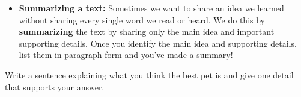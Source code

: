 \documentclass[12pt]{article}
\begin{document}
\vspace{1em}

\begin{tcolorbox}[colframe=black!40, colback=gray!5, 
coltitle=black, colbacktitle=black!20, fonttitle=\bfseries\Large, 
title=Additional Notes, halign title=center, left=5pt, right=5pt, top=5pt, bottom=15pt]

\begin{itemize}
    \item \textbf{Summarizing a text:} Sometimes we want to share an idea we learned without sharing every single word we read or heard. We do this by \textbf{summarizing} the text by sharing only the main idea and important supporting details. Once you identify the main idea and supporting details, list them in paragraph form and you've made a summary!
\end{itemize}
\end{tcolorbox}

\vspace{1em}

\begin{tcolorbox}[colframe=black!60, colback=white, 
coltitle=black, colbacktitle=black!15, fonttitle=\bfseries\Large, 
title=Exit Ticket, halign title=center, left=10pt, right=10pt, top=10pt, bottom=15pt]

Write a sentence explaining what you think the best pet is and give one detail that supports your answer.

\vspace{2cm} 
\underline{\hspace{15cm}} \\[0.8cm]
\underline{\hspace{15cm}} \\[0.8cm]
\underline{\hspace{15cm}} 
\end{tcolorbox}
\end{document}
